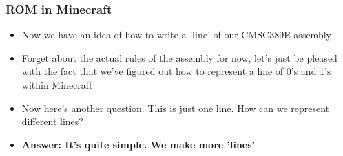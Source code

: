 \documentclass{beamer}
\begin{document}
             \begin{frame}
             	\frametitle{ROM in Minecraft}
             	\begin{itemize}
             		\item Now we have an idea of how to write a 'line' of our CMSC389E assembly
             		\item Forget about the actual rules of the assembly for now, let's just be pleased with the fact that we've figured out how to represent a line of 0's and 1's within Minecraft
             		\item Now here's another question. This is just one line. How can we represent different lines?
             		\item \textbf{Answer: It's quite simple. We make more 'lines'}
             	\end{itemize}
             	
             	{
             	\centering
             	


\begin{tikzpicture}[x=0.75pt,y=0.75pt,yscale=-1,xscale=1]


\end{tikzpicture}}
\end{frame}
\end{document}
